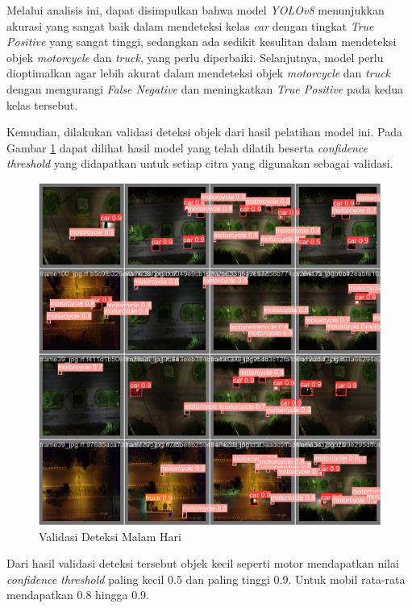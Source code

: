 Melalui analisis ini, dapat disimpulkan bahwa model \textit{YOLOv8} menunjukkan akurasi yang sangat baik dalam mendeteksi kelas \textit{car} dengan tingkat \textit{True Positive} yang sangat tinggi, sedangkan ada sedikit kesulitan dalam mendeteksi objek \textit{motorcycle} dan \textit{truck}, yang perlu diperbaiki. Selanjutnya, model perlu dioptimalkan agar lebih akurat dalam mendeteksi objek \textit{motorcycle} dan \textit{truck} dengan mengurangi \textit{False Negative} dan meningkatkan \textit{True Positive} pada kedua kelas tersebut.

Kemudian, dilakukan validasi deteksi objek dari hasil pelatihan model ini. Pada Gambar \ref{fig:validasi deteksi malam} dapat dilihat hasil model yang telah dilatih beserta \emph{confidence threshold} yang didapatkan untuk setiap citra yang digunakan sebagai validasi.

\begin{figure} [H] \centering
  \includegraphics[scale=0.25]{bab4/val_batch_malam.jpg}
  \caption{Validasi Deteksi Malam Hari}
  \label{fig:validasi deteksi malam}
\end{figure}
\vspace{-10pt}
Dari hasil validasi deteksi tersebut objek kecil seperti motor mendapatkan nilai \emph{confidence threshold} paling kecil 0.5 dan paling tinggi 0.9. Untuk mobil rata-rata mendapatkan 0.8 hingga 0.9.

